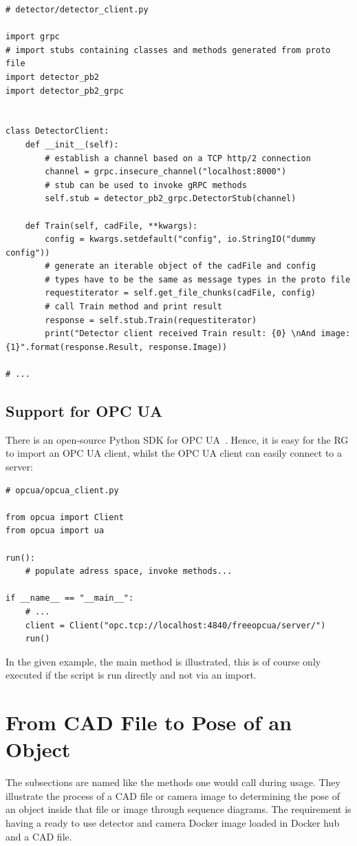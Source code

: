 \begin{verbatim}
# detector/detector_client.py

import grpc
# import stubs containing classes and methods generated from proto file
import detector_pb2
import detector_pb2_grpc


class DetectorClient:
    def __init__(self):
        # establish a channel based on a TCP http/2 connection
        channel = grpc.insecure_channel("localhost:8000")
        # stub can be used to invoke gRPC methods
        self.stub = detector_pb2_grpc.DetectorStub(channel)
    
    def Train(self, cadFile, **kwargs):
        config = kwargs.setdefault("config", io.StringIO("dummy config"))
        # generate an iterable object of the cadFile and config
        # types have to be the same as message types in the proto file
        requestiterator = self.get_file_chunks(cadFile, config)
        # call Train method and print result
        response = self.stub.Train(requestiterator)
        print("Detector client received Train result: {0} \nAnd image: {1}".format(response.Result, response.Image))
        
# ...
\end{verbatim}

\subsection{Support for OPC UA}
There is an open-source Python SDK for OPC UA~\cite{FreeOpcUa-Documentation2019OPC2019}. Hence, it is easy for the RG to import an OPC UA client, whilst the OPC UA client can easily connect to a server:
\begin{verbatim}
# opcua/opcua_client.py

from opcua import Client
from opcua import ua

run():
    # populate adress space, invoke methods...

if __name__ == "__main__":
    # ...
    client = Client("opc.tcp://localhost:4840/freeopcua/server/")
    run()
\end{verbatim}

In the given example, the main method is illustrated, this is of course only executed if the script is run directly and not via an import.

\section{From CAD File to Pose of an Object}
The subsections are named like the methods one would call during usage. They illustrate the process of a CAD file or camera image to determining the pose of an object inside that file or image through sequence diagrams. The requirement is having a ready to use detector and camera Docker image loaded in Docker hub and a CAD file. 

